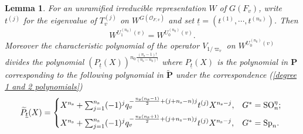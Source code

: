\documentclass[12pt,oneside,reqno]{amsart}
\theoremstyle{plain}
\newtheorem{lemma}[theorem]{Lemma}
\begin{document}
	
	
	
	\begin{lemma}
		For an unramified irreducible representation $W$ of $ G(F_v)$, write
		$t^{(j)}$ for the eigenvalue of $T_v^{(j)}$	on $W^{ G(\mathcal{O}_{F,v})}$
		and set $\underline{t}=(t^{(1)},\cdots,t^{(n_\mathrm{s})})$. Then
		\[
		W^{U_1^{(n_0)}(v)}
		=
		W^{U_0^{(n_0)}(v)}.
		\]
		Moreover the characteristic polynomial of the operator $V_{1/\varpi_v}$
		on $W^{U_0^{(n_0)}(v)}$ divides the polynomial		$(P_{\underline{t}}(X))^{n_0\frac{(n_\mathrm{s}-1)!}{(n_\mathrm{s}-n_0)!}}$
		where $P_{\underline{t}}(X)$ is the polynomial in $\mathbf{P}$	corresponding to the following polynomial in $\widetilde{\mathbf{P}}$
		under the correspondence (\ref{degree 1 and 2 polynomials})
		\begin{equation*}
			\widetilde{P}_{\underline{t}}(X)
			=
			\begin{cases*}
				X^{n_\mathrm{s}}
				+
				\sum_{j=1}^{n_\mathrm{s}}
				(-1)^j
				q_v^{-\frac{n_\mathrm{s}(n_\mathrm{s}-1)}{2}+(j+n_\mathrm{s}-n)j}
				t^{(j)}
				X^{n_\mathrm{s}-j},
				&
				$G^\ast=\mathrm{SO}_n^\eta$;
				\\
				X^{n_\mathrm{s}}
				+
				\sum_{j=1}^{n_\mathrm{s}}
				(-1)^j
				q_v^{-\frac{n_\mathrm{s}(n_\mathrm{s}+1)}{2}+(j+n_\mathrm{s}-n)j}
				t^{(j)}
				X^{n_\mathrm{s}-j},
				&
				$G^\ast=\mathrm{Sp}_n$.
			\end{cases*}
		\end{equation*}
	\end{lemma}
\end{document}
